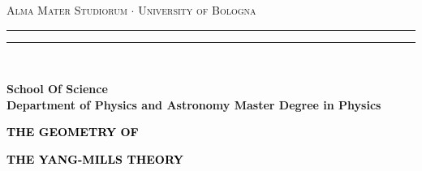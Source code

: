 \documentclass[12pt,a4paper]{report}
\theoremstyle{definition}
\theoremstyle{Theorem}
\theoremstyle{definition}
\theoremstyle{definition}
\begin{document}
	\begin{frontespizio}
		\begin{titlepage}
			\begin{center}
				{{\Large{\textsc{Alma Mater Studiorum $\cdot$ University of Bologna}}}} 
				\rule[0.1cm]{15.8cm}{0.1mm}
				\rule[0.5cm]{15.8cm}{0.6mm}
				\\\vspace{3mm}
				
				{\small{\bf 	School Of Science \\ 
						
						Department of Physics and Astronomy
						Master Degree in Physics}}
				
			\end{center}
			
			\vspace{23mm}
			
			\begin{center}\textcolor{black}{
					{\LARGE{\bf THE GEOMETRY OF }}
			}\end{center}
			\begin{center}\textcolor{black}{
					{\LARGE{\bf THE YANG-MILLS THEORY}}\\
			}\end{center}
			\begin{comment}
				\begin{center}\textcolor{black}{
						{\LARGE{\bf LA QUANTIZZAZIONE DEL}}\\
						\vspace{0.25cm}
						{\LARGE{\bf MOMENTO ANGOLARE}}
				}\end{center}
			\end{comment}
			
			\vspace{50mm} \par \noindent
			

\end{titlepage}
\end{frontespizio}
\end{document}
